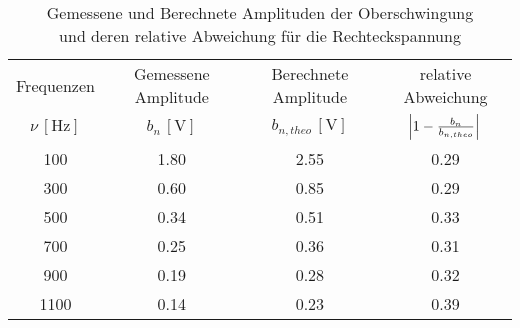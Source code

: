 \begin{table}[!h]
	\centering
	\begin{tabular}{|c|c|c|c|}
		\hline
		Frequenzen & Gemessene Amplitude & Berechnete Amplitude & relative Abweichung \\ 
		$\nu\,[\si{\hertz}]$ & $b_{n}\,[\si{\volt}]$ & $b_{n,theo}\,[\si{\volt}]$ & $\envert{1 - \tfrac{b_{n}}{b_{n,theo}}}$  \\\hline\hline
		\num{100}  & \num{1.80}  & \num{2.55}  & \num{0.29}  \\ 
		\num{300}  & \num{0.60}  & \num{0.85}  & \num{0.29}  \\ 
		\num{500}  & \num{0.34} & \num{0.51}  & \num{0.33} \\
		\num{700}  & \num{0.25} & \num{0.36}  & \num{0.31} \\ 
		\num{900}  & \num{0.19} & \num{0.28}  & \num{0.32} \\ 
		\num{1100} & \num{0.14} & \num{0.23}  & \num{0.39} \\\hline
	\end{tabular}
	\caption{Gemessene und Berechnete Amplituden der Oberschwingung\\ \hspace*{2.1cm}und deren relative Abweichung für die Rechteckspannung \label{tab:Analyse1}}
\end{table}